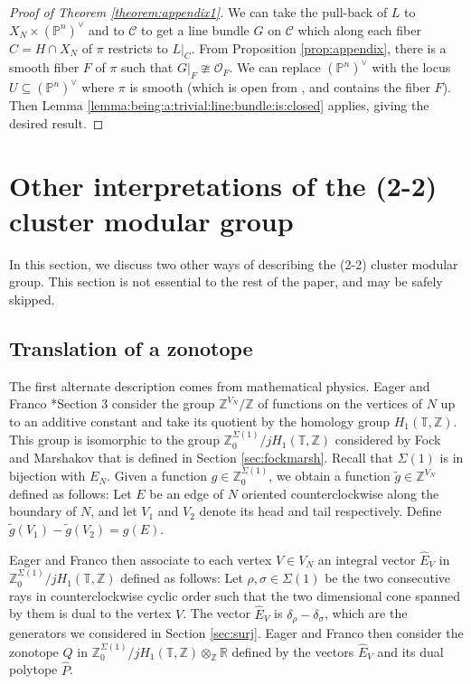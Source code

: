 \documentclass[11pt]{article} %
\theoremstyle{definition}
\newcommand{\Z}{{\mathbb Z}}
\newcommand{\R}{{\mathbb R}}
\newcommand{\T}{{\mathbb T}}
\newcommand{\la}{\label}
\newcommand{\cC}{{\mathcal{C}}}
\newcommand{\cO}{{\mathcal{O}}}
\begin{document}
\begin{proof}[Proof of Theorem \ref{theorem:appendix1}]
We can take the pull-back of $L$ to $X_N\times (\mathbb{P}^n)^\vee$ and to $\cC$ to get a line bundle $G$ on $\cC$ which along each fiber $C=H\cap X_N$ of $\pi$ restricts to $L|_C$.
From Proposition \ref{prop:appendix}, there is a smooth fiber $F$ of $\pi$ such that $G|_F \ncong \cO_{F}$. We can replace $(\mathbb{P}^n)^\vee$ with the locus $U\subseteq (\mathbb{P}^n)^\vee$ where $\pi$ is smooth (which is open from \cite[Theorem 12.2.4]{EGAIV}, and contains the fiber $F$). Then Lemma \ref{lemma:being:a:trivial:line:bundle:is:closed} applies, giving the desired result.
\end{proof}
\section{Other interpretations of the (2-2) cluster modular group}
In this section, we discuss two other ways of describing the (2-2) cluster modular group. This section is not essential to the rest of the paper, and may be safely skipped.
\subsection{Translation of a zonotope}\la{sec:ef}
The first alternate description comes from mathematical physics. Eager and Franco \cite{EF}*{Section 3} consider the group $\Z^{V_N}/\Z$ of functions on the vertices of $N$ up to an additive constant and take its quotient by the homology group $H_1(\T,\Z)$. This group is isomorphic to the group $\Z^{\Sigma(1)}_0/jH_1(\T,\Z)$ considered by Fock and Marshakov \cite{FM16} that is defined in Section \ref{sec:fockmarsh}. Recall that $\Sigma(1)$ is in bijection with $E_N$. Given a function $g \in \Z^{\Sigma(1)}_0$, we obtain a function $\widetilde g \in \Z^{V_N}$ defined as follows:  Let $E$ be an edge of $N$ oriented counterclockwise along the boundary of $N$, and let $V_1$ and $V_2$ denote its head and tail respectively. Define $\widetilde g(V_1)-\widetilde g(V_2)=g(E)$. 

Eager and Franco then associate to each vertex $V \in V_N$ an integral vector $\widehat E_V$ in $\Z^{\Sigma(1)}_0/jH_1(\T,\Z)$ defined as follows: Let $\rho, \sigma \in \Sigma(1)$ be the two consecutive rays in counterclockwise cyclic order such that the two dimensional cone spanned by them is dual to the vertex $V$. The vector $\widehat E_V$ is  $\delta_{\rho}-\delta_{\sigma}$, which are the generators we considered in Section \ref{sec:surj}. Eager and Franco then consider the zonotope $Q$ in $\Z^{\Sigma(1)}_0/jH_1(\T,\Z) \otimes_\Z \R$ defined by the vectors $\widehat E_V$ and its dual polytope $\widehat P$. 
\end{document}
